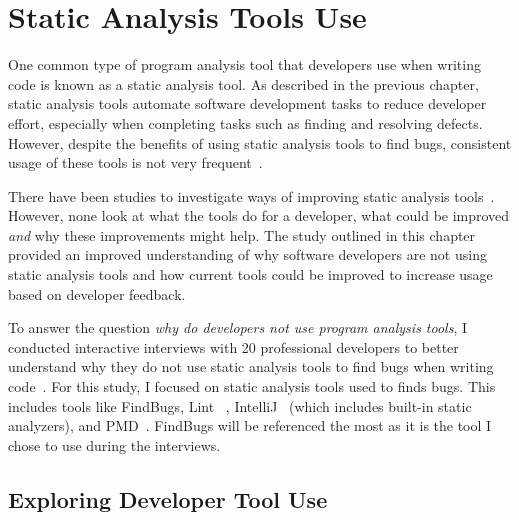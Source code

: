 \chapter{Static Analysis Tools Use}
\label{chap:why}

One common type of program analysis tool that developers use when writing code is known as a static analysis tool. 
As described in the previous chapter, static analysis tools automate software development tasks to reduce developer effort, especially when completing tasks such as finding and resolving defects.
However, despite the benefits of using static analysis tools to find bugs, consistent
usage of these tools is not very frequent~\cite{Ayewah:2008:FindBugs, ge2012reconciling}.
 
There have been studies to investigate ways of improving static analysis tools~\cite{Bessey:2010:Coverity, Khoo:2008:PathProjection}.
However, none look at what the tools do for a developer, what could be improved \emph{and}
why these improvements might help. The study outlined in this chapter provided an improved understanding 
of why software developers are not using static analysis tools and how
current tools could be improved to increase usage based on developer feedback.

To answer the question \emph{why do developers not use program analysis tools}, I conducted interactive interviews with 20 professional developers to better understand why they do not use static analysis tools to find bugs when writing code~\cite{johnson2013don}.
For this study, I focused on static analysis tools used to finds bugs.
This includes tools like FindBugs, Lint~\cite{Johnson:1978:Lint} ,
IntelliJ~\cite{IntelliJIDEA} (which includes built-in static analyzers), and
PMD~\cite{PMD}. FindBugs will be referenced the most as it is the tool I chose
to use during the interviews.

\section{Exploring Developer Tool Use}


